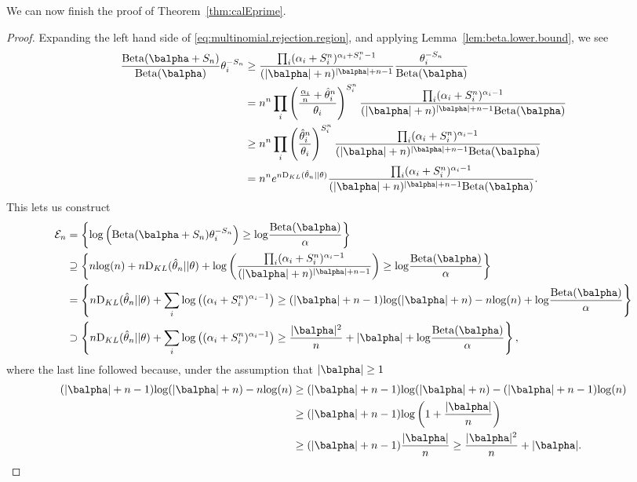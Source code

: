 \documentclass[11pt]{article}
\def\log{{\rm log}}
\newcommand{\Beta}{\mathrm{Beta}}
\newcommand{\KL}{\mathrm{D}_{KL}}
\begin{document}
We can now finish the proof of Theorem~\ref{thm:calEprime}.
\begin{proof}
Expanding the left hand side of \eqref{eq:multinomial.rejection.region}, and applying Lemma~\ref{lem:beta.lower.bound}, we see
\begin{align*}
    \frac{\Beta(\balpha + S_n)}
  {\Beta(\balpha)} \theta_i^{-S_n}
  &\geq
    \frac{ \prod_i (\alpha_i+S_i^n)^{\alpha_i + S_i^n-1}}
    {(|\balpha|+n)^{|\balpha| + n - 1}}
    \frac{ \theta_i^{-S_n}}{\Beta(\balpha)}\\
  &=
    n^n
    \prod_i
    \left(
    \frac{\frac{\alpha_i}{n} + \hat \theta_i^n}{\theta_i}\right)^{S_i^n}
    \frac{
    \prod_i
    (\alpha_i + S_i^n)^{\alpha_i - 1}
    }
    {(|\balpha|+n)^{|\balpha|+n-1}\Beta(\balpha)}\\
  &\geq
    n^n
    \prod_i
    \left(
    \frac{\hat \theta_i^n}{\theta_i}\right)^{S_i^n}
    \frac{
    \prod_i
    (\alpha_i + S_i^n)^{\alpha_i - 1}
    }
    {(|\balpha|+n)^{|\balpha|+n-1}\Beta(\balpha)}\\
  &=
    n^n
    e^{n \KL(\hat\theta_n|| \theta) }
    \frac{
    \prod_i
    (\alpha_i + S_i^n)^{\alpha_i - 1}
    }
    {(|\balpha|+n)^{|\balpha|+n-1}\Beta(\balpha)}.
\end{align*}
This lets us construct
\begin{align*}
  \mathcal E_n
  &=
  \left\{
    \log \left(
    \Beta(\balpha+S_n) \theta_i^{-S_n}
  \right)
  \geq \log\frac{\Beta(\balpha)}{\alpha}
    \right\}\\
  &\supseteq
    \left\{
        n\log(n)
    +n \KL(\hat\theta_n|| \theta)
    +
    \log\left(\frac{
    \prod_i
    (\alpha_i + S_i^n)^{\alpha_i - 1}
    }
    {(|\balpha|+n)^{|\balpha|+n-1}}\right)
    \geq
    \log\frac{\Beta(\balpha)}{\alpha}
    \right\}\\
  &=
    \left\{
    n \KL(\hat\theta_n|| \theta)
    +
    \sum_i\log\left(
    (\alpha_i + S_i^n)^{\alpha_i - 1}
    \right)
    \geq
    (|\balpha|+n-1)\log(|\balpha|+n)
    -n\log(n)
    +\log\frac{\Beta(\balpha)}{\alpha}
    \right\}\\
    &\supset
    \left\{
    n \KL(\hat\theta_n|| \theta)
    +
    \sum_i\log\left(
    (\alpha_i + S_i^n)^{\alpha_i - 1}
    \right)
    \geq
      \frac{|\balpha|^2}{n} + |\balpha|
    +\log\frac{\Beta(\balpha)}{\alpha}
    \right\},
\end{align*}
where the last line followed because, under the assumption that $|\balpha| \geq 1$
\begin{align*}
    (|\balpha|+n-1)\log(|\balpha|+n)
  -n\log(n)
  &\geq
    (|\balpha|+n-1)\log(|\balpha|+n)
    -(|\balpha|+n-1)\log(n)\\
  &\geq
  (|\balpha|+n-1)
    \log\left(1+\frac{|\balpha|}{n}\right)\\
  &\geq
    (|\balpha|+n-1)\frac{|\balpha|}{n}
    \geq
    \frac{|\balpha|^2}{n} + |\balpha|.
\end{align*}


\end{proof}
\end{document}
